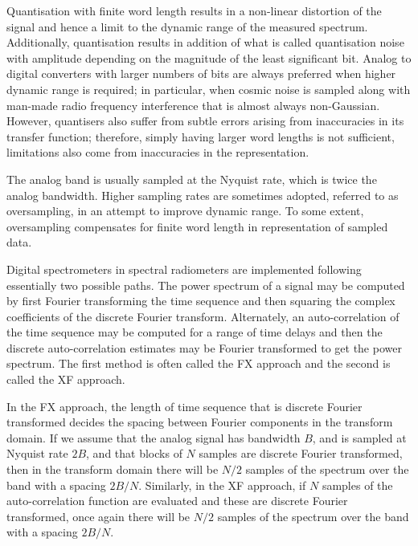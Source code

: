   Quantisation with finite word length results in a non-linear distortion of the signal and hence a limit to the dynamic range of the measured spectrum.  Additionally, quantisation results in addition of what is called quantisation noise with amplitude depending on the magnitude of the least significant bit.  Analog to digital converters with larger numbers of bits are always preferred when higher dynamic range is required; in particular, when cosmic noise is sampled along with man-made radio frequency interference that is almost always non-Gaussian.  However, quantisers also suffer from subtle errors arising from inaccuracies in its transfer function; therefore, simply having larger word lengths is not sufficient, limitations also come from inaccuracies in the representation.
  
  The analog band is usually sampled at the Nyquist rate, which is twice the analog bandwidth.  Higher sampling rates are sometimes adopted, referred to as oversampling, in an attempt to improve dynamic range. To some extent, oversampling compensates for finite word length in representation of sampled data.
  
  Digital spectrometers in spectral radiometers are implemented following essentially two possible paths.  The power spectrum of a signal may be computed by first Fourier transforming the time sequence and then squaring the complex coefficients of the discrete Fourier transform.  Alternately, an auto-correlation of the time sequence may be computed for a range of time delays and then the discrete auto-correlation estimates may be Fourier transformed to get the power spectrum. The first method is often called the FX approach and the second is called the XF approach. 
  
  In the FX approach, the length of time sequence that is discrete Fourier transformed decides the spacing between Fourier components in the transform domain.  If we assume that the analog signal has bandwidth $B$, and is sampled at Nyquist rate $2B$, and that blocks of $N$ samples are discrete Fourier transformed, then in the transform domain there will be $N/2$ samples of the spectrum over the band with a spacing $2B/N$.  Similarly, in the XF approach, if $N$ samples of the auto-correlation function are evaluated and these are discrete Fourier transformed, once again there will be $N/2$ samples of the spectrum over the band with a spacing $2B/N$.
  
